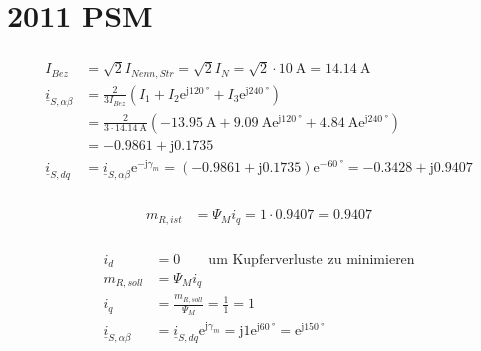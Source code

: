 \documentclass[11pt,a4paper]{scrartcl}
\newcommand{\mybr}[1]{\left(#1\right)}
\renewcommand{\j}{\mathrm{j}}
\renewcommand{\i}{\underline{i}}
\newcommand{\0}{_{\mybr{0}}}
\newcommand{\1}{_{\mybr{1}}}
\newcommand{\2}{_{\mybr{2}}}
\renewcommand{\e}{\mathrm{e}}
\newcommand{\isab}{\i_{S,\alpha\beta}}
\newcommand{\isdq}{\i_{S,dq}}
\begin{document}
\clearpage
\part{2011 PSM}
\section{}
\begin{align}
I_{Bez}&=\sqrt{2}I_{Nenn,Str}=\sqrt{2}I_N=\sqrt{2}\cdot\SI{10}{\ampere}=\SI{14.14}{\ampere}\\
\isab&=\frac{2}{3I_{Bez}}\mybr{I_1+I_2\e^{\j\SI{120}{\degree}}+I_3\e^{\j\SI{240}{\degree}}}\\
&=\frac{2}{3\cdot\SI{14.14}{\ampere}}\mybr{\SI{-13.95}{\ampere}+\SI{9.09}{\ampere}\e^{\j\SI{120}{\degree}}+\SI{4.84}{\ampere}\e^{\j\SI{240}{\degree}}}\\
&=\num{-0.9861}+\j\num{0.1735}\\
\isdq&=\isab\e^{-\j\gamma_m}=\mybr{\num{-0.9861}+\j\num{0.1735}}\e^{-\SI{60}{\degree}}=\num{-0.3428}+\j\num{0.9407}
\end{align}

\section{}
\begin{align}
m_{R,ist}&=\Psi_M i_q=1\cdot\num{0.9407}=\num{0.9407}
\end{align}

\section{}
\begin{align}
i_d&=0\quad\quad\text{um Kupferverluste zu minimieren}\\
m_{R,soll}&=\Psi_M i_q\\
i_q&=\frac{m_{R,soll}}{\Psi_M}=\frac{1}{1}=1\\
\isab&=\isdq\e^{\j\gamma_m}=\j 1\e^{\j\SI{60}{\degree}}=\e^{\j\SI{150}{\degree}}
\end{align}
\end{document}
